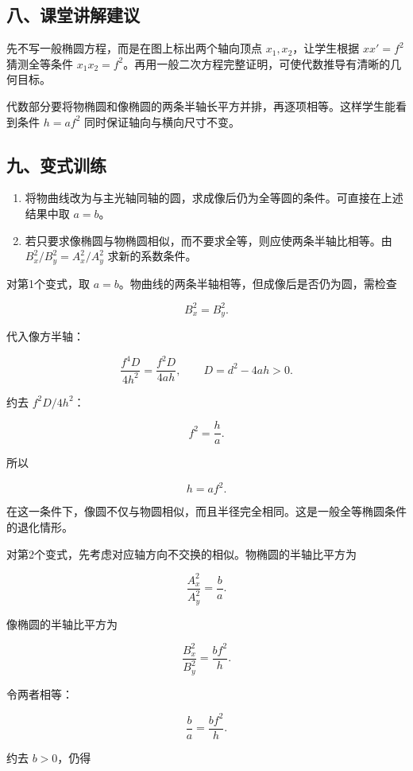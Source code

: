 \documentclass[12pt,a4paper,UTF8]{ctexart}
\newcommand{\tightlist}{\setlength{\itemsep}{0pt}\setlength{\parskip}{0pt}}
\begin{document}
\subsection{八、课堂讲解建议}\label{ux516bux8bfeux5802ux8bb2ux89e3ux5efaux8bae-6}

先不写一般椭圆方程，而是在图上标出两个轴向顶点 \(x_1,x_2\)，让学生根据
\(xx'=f^2\) 猜测全等条件
\(x_1x_2=f^2\)。再用一般二次方程完整证明，可使代数推导有清晰的几何目标。

代数部分要将物椭圆和像椭圆的两条半轴长平方并排，再逐项相等。这样学生能看到条件
\(h=af^2\) 同时保证轴向与横向尺寸不变。

\subsection{九、变式训练}\label{ux4e5dux53d8ux5f0fux8badux7ec3-6}

\begin{enumerate}
\def\labelenumi{\arabic{enumi}.}
\tightlist
\item
  将物曲线改为与主光轴同轴的圆，求成像后仍为全等圆的条件。可直接在上述结果中取
  \(a=b\)。
\item
  若只要求像椭圆与物椭圆相似，而不要求全等，则应使两条半轴比相等。由
  \(B_x^2/B_y^2=A_x^2/A_y^2\) 求新的系数条件。
\end{enumerate}

对第1个变式，取
\(a=b\)。物曲线的两条半轴相等，但成像后是否仍为圆，需检查

\[B_x^2=B_y^2.\]

代入像方半轴：

\[\frac{f^4D}{4h^2}
=\frac{f^2D}{4ah},
\qquad D=d^2-4ah>0.\]

约去 \(f^2D/4h^2\)：

\[f^2=\frac ha.\]

所以

\[h=af^2.\]

在这一条件下，像圆不仅与物圆相似，而且半径完全相同。这是一般全等椭圆条件的退化情形。

对第2个变式，先考虑对应轴方向不交换的相似。物椭圆的半轴比平方为

\[\frac{A_x^2}{A_y^2}=\frac ba.\]

像椭圆的半轴比平方为

\[\frac{B_x^2}{B_y^2}
=\frac{bf^2}{h}.\]

令两者相等：

\[\frac ba=\frac{bf^2}{h}.\]

约去 \(b>0\)，仍得
\end{document}
